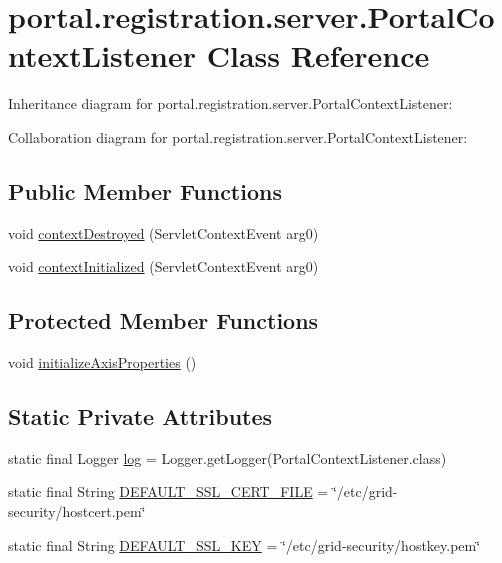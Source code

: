 \hypertarget{classportal_1_1registration_1_1server_1_1PortalContextListener}{
\section{portal.registration.server.PortalContextListener Class Reference}
\label{classportal_1_1registration_1_1server_1_1PortalContextListener}
}


Inheritance diagram for portal.registration.server.PortalContextListener:


Collaboration diagram for portal.registration.server.PortalContextListener:
\subsection*{Public Member Functions}
\begin{DoxyCompactItemize}
\item 
void \hyperlink{classportal_1_1registration_1_1server_1_1PortalContextListener_a907dff159c77a949be09f9742f14377c}{contextDestroyed} (ServletContextEvent arg0)
\item 
void \hyperlink{classportal_1_1registration_1_1server_1_1PortalContextListener_a6d812a29045e6847a17e3213865d9351}{contextInitialized} (ServletContextEvent arg0)
\end{DoxyCompactItemize}
\subsection*{Protected Member Functions}
\begin{DoxyCompactItemize}
\item 
void \hyperlink{classportal_1_1registration_1_1server_1_1PortalContextListener_aac92d42095e98923e9680f1837a46468}{initializeAxisProperties} ()
\end{DoxyCompactItemize}
\subsection*{Static Private Attributes}
\begin{DoxyCompactItemize}
\item 
static final Logger \hyperlink{classportal_1_1registration_1_1server_1_1PortalContextListener_a456018b93684d7862baf2345b0e02da5}{log} = Logger.getLogger(PortalContextListener.class)
\item 
static final String \hyperlink{classportal_1_1registration_1_1server_1_1PortalContextListener_a3fbced411701333a0264f0ea12a1b0f3}{DEFAULT\_\-SSL\_\-CERT\_\-FILE} = \char`\"{}/etc/grid-\/security/hostcert.pem\char`\"{}
\item 
static final String \hyperlink{classportal_1_1registration_1_1server_1_1PortalContextListener_a88510b32b342fcacfe0f48d5fb1b17e9}{DEFAULT\_\-SSL\_\-KEY} = \char`\"{}/etc/grid-\/security/hostkey.pem\char`\"{}
\end{DoxyCompactItemize}


